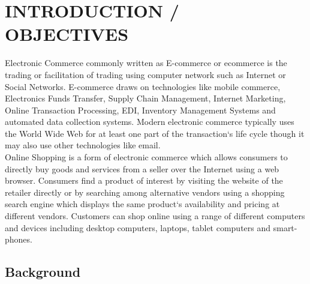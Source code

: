 \documentclass[hidelinks,a4paper,12pt]{article}
\begin{document}
\begin{titlepage}

\thispagestyle{empty}

\end{titlepage}

\tableofcontents

\setcounter{tocdepth}{3}	

\newpage

\clearpage

\pagestyle{plain}
\setcounter{page}{1}


\section{\MakeUppercase{Introduction / Objectives}}

\Gls{Electronic Commerce} commonly written as E-commerce or ecommerce is the trading or facilitation of trading using \gls{computer network} such as \Gls{Internet} or \Gls{Social Networks}. E-commerce draws on technologies like \Gls{mobile commerce}, Electronics Funds Transfer, \Gls{Supply Chain Management}, \Gls{Internet Marketing}, \Gls{Online Transaction Processing}, \Gls{EDI}, \Gls{Inventory Management} Systems and automated data collection systems. Modern electronic commerce typically uses the \Gls{World Wide Web} for at least one part of the transaction`s life cycle though it may also use other technologies like \gls{email}.
\\

Online Shopping is a form of electronic commerce which allows consumers to directly buy goods and services from a seller over the Internet using a \gls{web browser}. Consumers find a product of interest by visiting the website of the retailer directly or by searching among alternative vendors using a shopping \gls{search engine} which displays the same product`s availability and pricing at different vendors. Customers can shop online using a range of different computers and devices including desktop computers, laptops, tablet computers and smart-phones.

\subsection{Background}
\end{document}
